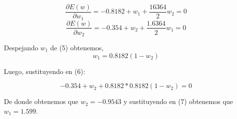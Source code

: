 \documentclass[a4paper]{article}
\begin{document}
\begin{equation}
\frac{\partial E(w)}{\partial w_{1}} = -0.8182 + w_{1} + \frac{16364}{2}w_{2} = 0
\end{equation} 
\begin{equation}
\frac{\partial E(w)}{\partial w_{2}} = -0.354 + w_{2} + \frac{1.6364}{2}w_{1} = 0
\end{equation}

Despejando $w_{1}$ de (5) obtenemos,
\begin{equation}
w_{1} = 0.8182(1 - w_{2})
\end{equation}

Luego, sustituyendo en (6):

$$-0.354 + w_{2} + 0.8182*0.8182(1-w_{2}) = 0$$

De donde obtenemos que $w_{2} = -0.9543$ y sustituyendo en (7) obtenemos que $w_{1} = 1.599$.\\
\end{document}

